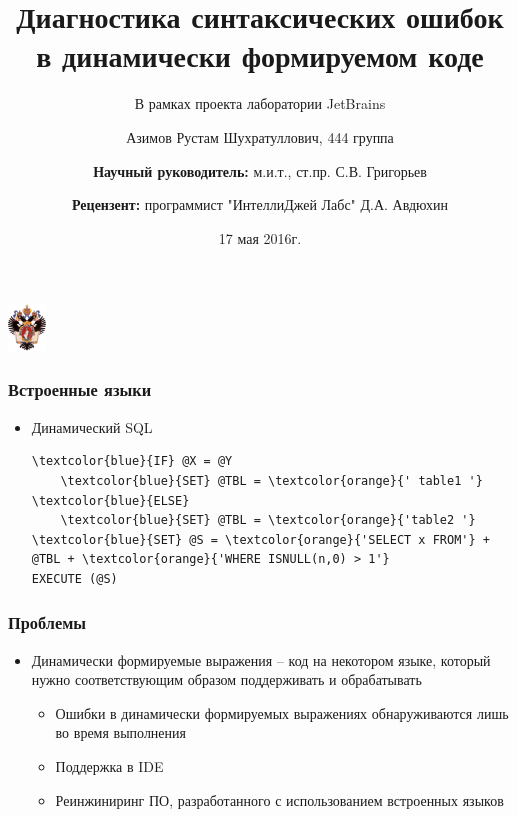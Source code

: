 \documentclass{beamer}
\title[]{Диагностика синтаксических ошибок в динамически формируемом коде}
\subtitle[]{В рамках проекта лаборатории JetBrains}
\institute[СПбГУ]{
Санкт-Петербургский государственный университет \\
Кафедра системного программирования }
\author[Азимов Рустам]{Азимов Рустам Шухратуллович, 444 группа \\
  \and  
    {\bfseries Научный руководитель:} м.и.т., ст.пр. С.В. Григорьев \\ 
  \and
    {\bfseries Рецензент:} программист "ИнтеллиДжей Лабс" Д.А. Авдюхин}
\date{17 мая 2016г.}
\begin{document}
{
\begin{frame}
  \begin{center}
  {\includegraphics[width=1cm]{pictures/SPbGU_Logo.png}}
  \end{center}
  \titlepage
\end{frame}
}

\begin{frame}[fragile]
  \transwipe[direction=90]
  \frametitle{Встроенные языки}
  \begin{itemize}
    \item Динамический SQL
      \begin{Verbatim}[commandchars=\\\{\}]
\textcolor{blue}{IF} @X = @Y
    \textcolor{blue}{SET} @TBL = \textcolor{orange}{' table1 '}
\textcolor{blue}{ELSE}
    \textcolor{blue}{SET} @TBL = \textcolor{orange}{'table2 '}
\textcolor{blue}{SET} @S = \textcolor{orange}{'SELECT x FROM'} + @TBL + \textcolor{orange}{'WHERE ISNULL(n,0) > 1'}
EXECUTE (@S)
       \end{Verbatim}
    \end{itemize}
\end{frame}

\begin{frame}[fragile]
	\transwipe[direction=90]
	\frametitle{Проблемы}
	\begin{itemize}
	    \item Динамически формируемые выражения -- код на некотором языке, который нужно соответствующим образом поддерживать и обрабатывать
        \begin{itemize}
    	    \item Ошибки в динамически формируемых выражениях обнаруживаются лишь во время выполнения
	        \item Поддержка в IDE
	        \item Реинжиниринг ПО, разработанного с использованием встроенных языков
	    \end{itemize}
    \end{itemize}
\end{frame}
\end{document}
